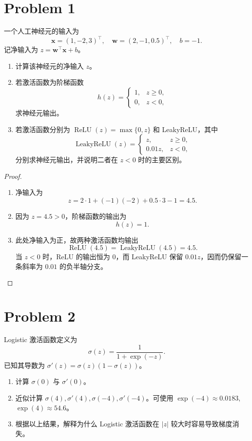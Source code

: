 \section*{Problem 1}

一个人工神经元的输入为
\[
\bm{x} = (1, -2, 3)^\top,\quad
\bm{w} = (2, -1, 0.5)^\top,\quad
b = -1.
\]
记净输入为 $z = \bm{w}^\top \bm{x} + b$。
\begin{enumerate}
    \item 计算该神经元的净输入 $z$。
    \item 若激活函数为阶梯函数
    \[
    h(z) = \begin{cases}
        1, & z \ge 0,\\
        0, & z < 0,
    \end{cases}
    \]
    求神经元输出。
    \item 若激活函数分别为 $\operatorname{ReLU}(z) = \max\{0, z\}$ 和 LeakyReLU，其中
    \[
    \operatorname{LeakyReLU}(z) = \begin{cases}
        z,      & z \ge 0,\\
        0.01z,  & z < 0,
    \end{cases}
    \]
    分别求神经元输出，并说明二者在 $z < 0$ 时的主要区别。
\end{enumerate}

\begin{proof}
    \begin{enumerate}
        \item 净输入为
        \[
            z = 2\cdot 1 + (-1)(-2) + 0.5\cdot 3 - 1
              = \boxed{4.5}.
        \]
        \item 因为 $z=4.5>0$，阶梯函数的输出为
        \[
            \boxed{h(z)=1}.
        \]
        \item 此处净输入为正，故两种激活函数均输出
        \[
            \operatorname{ReLU}(4.5)
            = \operatorname{LeakyReLU}(4.5)
            = \boxed{4.5}.
        \]
        当 $z<0$ 时，ReLU 的输出恒为 $0$，而 LeakyReLU 保留 $0.01z$，因而仍保留一条斜率为 $0.01$ 的负半轴分支。
    \end{enumerate}
\end{proof}

\section*{Problem 2}

Logistic 激活函数定义为
\[
\sigma(z) = \frac{1}{1 + \exp(-z)}.
\]
已知其导数为 $\sigma'(z) = \sigma(z)(1 - \sigma(z))$。
\begin{enumerate}
    \item 计算 $\sigma(0)$ 与 $\sigma'(0)$。
    \item 近似计算 $\sigma(4), \sigma'(4), \sigma(-4), \sigma'(-4)$。可使用 $\exp(-4) \approx 0.0183$, $\exp(4) \approx 54.6$。
    \item 根据以上结果，解释为什么 Logistic 激活函数在 $|z|$ 较大时容易导致梯度消失。
\end{enumerate}

